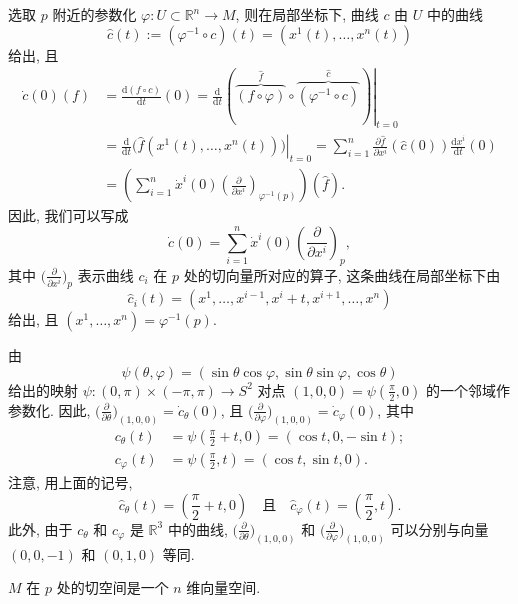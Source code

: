 选取 $p$ 附近的参数化 $\varphi:U\subset\mathbb{R}^n\to M$, 则在局部坐标下, 曲线 $c$ 由 $U$ 中的曲线
\[
  \widehat c(t):=(\varphi^{-1}\circ c)(t)=(x^1(t),\ldots,x^n(t))
\]
给出, 且
\begin{align*}
  \dot c(0)(f)
    &=\frac{\mathrm{d}(f\circ c)}{\mathrm{d}t}(0)
      =\left.\frac{\mathrm{d}}{\mathrm{d}t}
      \left(\overbrace{(f\circ\varphi)}^{\widehat f}
      \circ\overbrace{(\varphi^{-1}\circ c)}^{\widehat c}\right)\right|_{t=0}\\
    &=\left.\frac{\mathrm{d}}{\mathrm{d}t}
      \bigl(\widehat f(x^1(t),\ldots,x^n(t))\bigr)\right|_{t=0}
      =\sum_{i=1}^n
      \frac{\partial\widehat f}{\partial x^i}(\widehat c(0))
      \frac{\mathrm{d}x^i}{\mathrm{d}t}(0)\\
    &=\left(\sum_{i=1}^n\dot x^i(0)
      \left(\frac{\partial}{\partial x^i}\right)_{\varphi^{-1}(p)}\right)(\widehat f).
\end{align*}
因此, 我们可以写成
\[
  \dot c(0)=\sum_{i=1}^n\dot x^i(0)\left(\frac{\partial}{\partial x^i}\right)_p,
\]
其中 $\bigl(\frac{\partial}{\partial x^i}\bigr)_p$ 表示曲线 $c_i$ 在 $p$ 处的切向量所对应的算子, 这条曲线在局部坐标下由
\[
  \widehat c_i(t)=(x^1,\ldots,x^{i-1},x^i+t,x^{i+1},\ldots,x^n)
\]
给出, 且 $(x^1,\ldots,x^n)=\varphi^{-1}(p)$.

\begin{RiemannExample}\label{ex:coordinate-tangent-vectors-on-sphere}
由
\[
  \psi(\theta,\varphi)=(\sin\theta\cos\varphi,\sin\theta\sin\varphi,\cos\theta)
\]
给出的映射 $\psi:(0,\pi)\times(-\pi,\pi)\to S^2$ 对点 $(1,0,0)=\psi(\frac{\pi}{2},0)$ 的一个邻域作参数化. 因此, $\bigl(\frac{\partial}{\partial\theta}\bigr)_{(1,0,0)}=\dot c_\theta(0)$, 且 $\bigl(\frac{\partial}{\partial\varphi}\bigr)_{(1,0,0)}=\dot c_\varphi(0)$, 其中
\begin{align*}
  c_\theta(t)&=\psi\left(\frac{\pi}{2}+t,0\right)=(\cos t,0,-\sin t);\\
  c_\varphi(t)&=\psi\left(\frac{\pi}{2},t\right)=(\cos t,\sin t,0).
\end{align*}
注意, 用上面的记号,
\[
  \widehat c_\theta(t)=\left(\frac{\pi}{2}+t,0\right)
  \quad\text{且}\quad
  \widehat c_\varphi(t)=\left(\frac{\pi}{2},t\right).
\]
此外, 由于 $c_\theta$ 和 $c_\varphi$ 是 $\mathbb{R}^3$ 中的曲线, $\bigl(\frac{\partial}{\partial\theta}\bigr)_{(1,0,0)}$ 和 $\bigl(\frac{\partial}{\partial\varphi}\bigr)_{(1,0,0)}$ 可以分别与向量 $(0,0,-1)$ 和 $(0,1,0)$ 等同.
\end{RiemannExample}

\begin{RiemannProposition}\label{prop:dimension-of-tangent-space}
$M$ 在 $p$ 处的切空间是一个 $n$ 维向量空间.
\end{RiemannProposition}

